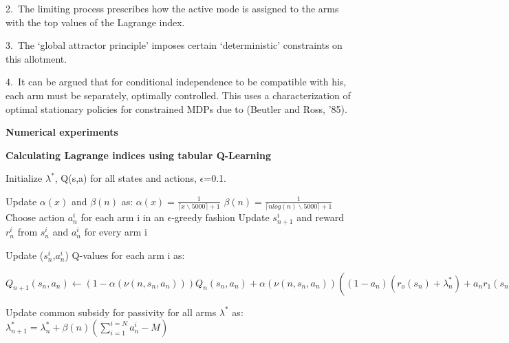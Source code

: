 \documentclass{slides}
\begin{document}
{2.\ The limiting process prescribes how the active mode is assigned to the arms with the top values of the Lagrange index. 

3.\ The `global attractor principle' imposes certain `deterministic' constraints on this allotment. 

4.\ It can be argued that for conditional independence to be compatible with his, each arm must be separately, optimally controlled. This uses a characterization of optimal stationary policies for constrained MDPs due to (Beutler and Ross, '85).



\newpage

{\large \color{144}

\begin{center}
\textbf{\Large Numerical experiments}
\end{center}
\newpage
\textbf{Calculating Lagrange indices using tabular Q-Learning}
\begin{algorithm}[H]
\begin{small}
\begin{algorithmic}[1]
    \State Initialize $\lambda^*$, Q(s,a) for all states and actions, $\epsilon$=0.1.


        \State Update $\alpha(x)$ and $\beta(n)$ as:
        $\alpha(x)=\frac{1}{\lceil{x\backslash5000}\rceil+1}$ $\beta(n)=\frac{1}{\lceil{nlog(n)\backslash5000}\rceil+1}$
        \State Choose action $a_{n}^i$ for each arm i in an $\epsilon$-greedy fashion
        \State Update $s_{n+1}^i$ and reward $r_n^i$ from $s_{n}^i$ and $a_{n}^i$ for every arm i
        
        \State Update ($s_n^i$,$a_n^i$) Q-values for each arm i as:
        \Statex\begin{small}$Q_{n+1}(s_n,a_n)\gets(1-\alpha(\nu(n,s_n,a_n)))Q_n(s_n,a_n)+\alpha(\nu(n,s_n,a_n))((1-a_n)(r_o(s_n)+\lambda_n^*)+a_nr_1(s_n)+\underset{v\epsilon\{0,1\}}{max}Q_n(s_{n+1},v)-\frac{1}{2d}\sum\limits_{k\in S}Q_n(k,0)+Q_n(k,1))$\end{small}
        \State Update common subsidy for passivity for all arms $\lambda^*$ as: $\lambda_{n+1}^*=\lambda_n^*+\beta(n)(\sum\limits_{i=1}^{i=N}a_n^i-M)$
        

\end{algorithmic}
\end{small}
\end{algorithm}}}
\end{document}
